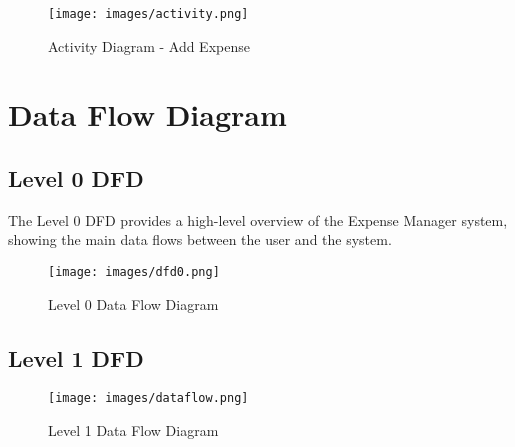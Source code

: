\begin{figure}[H]
\centering
\texttt{[image: images/activity.png]}
\caption{Activity Diagram - Add Expense}
\label{fig:activity}
\end{figure}

\section{Data Flow Diagram}

\subsection{Level 0 DFD}

The Level 0 DFD provides a high-level overview of the Expense Manager system, showing the main data flows between the user and the system.

\begin{figure}[H]
\centering
\texttt{[image: images/dfd0.png]}
\caption{Level 0 Data Flow Diagram}
\label{fig:dfd0}
\end{figure}

\subsection{Level 1 DFD}

\begin{figure}[H]
\centering
\texttt{[image: images/dataflow.png]}
\caption{Level 1 Data Flow Diagram}
\label{fig:dfd1}
\end{figure}
